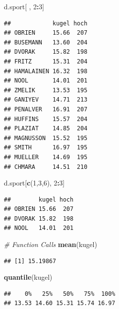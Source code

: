 \documentclass[
]{article}
\newenvironment{Shaded}{\begin{snugshade}}{\end{snugshade}}
\newcommand{\CommentTok}[1]{\textcolor[rgb]{0.56,0.35,0.01}{\textit{#1}}}
\newcommand{\DecValTok}[1]{\textcolor[rgb]{0.00,0.00,0.81}{#1}}
\newcommand{\FunctionTok}[1]{\textcolor[rgb]{0.13,0.29,0.53}{\textbf{#1}}}
\newcommand{\NormalTok}[1]{#1}
\newcommand{\SpecialCharTok}[1]{\textcolor[rgb]{0.81,0.36,0.00}{\textbf{#1}}}
\begin{document}
\begin{Shaded}
\begin{Highlighting}[]
\NormalTok{d.sport[ , }\DecValTok{2}\SpecialCharTok{:}\DecValTok{3}\NormalTok{]}
\end{Highlighting}
\end{Shaded}

\begin{verbatim}
##            kugel hoch
## OBRIEN     15.66  207
## BUSEMANN   13.60  204
## DVORAK     15.82  198
## FRITZ      15.31  204
## HAMALAINEN 16.32  198
## NOOL       14.01  201
## ZMELIK     13.53  195
## GANIYEV    14.71  213
## PENALVER   16.91  207
## HUFFINS    15.57  204
## PLAZIAT    14.85  204
## MAGNUSSON  15.52  195
## SMITH      16.97  195
## MUELLER    14.69  195
## CHMARA     14.51  210
\end{verbatim}

\begin{Shaded}
\begin{Highlighting}[]
\NormalTok{d.sport[}\FunctionTok{c}\NormalTok{(}\DecValTok{1}\NormalTok{,}\DecValTok{3}\NormalTok{,}\DecValTok{6}\NormalTok{), }\DecValTok{2}\SpecialCharTok{:}\DecValTok{3}\NormalTok{]}
\end{Highlighting}
\end{Shaded}

\begin{verbatim}
##        kugel hoch
## OBRIEN 15.66  207
## DVORAK 15.82  198
## NOOL   14.01  201
\end{verbatim}

\begin{Shaded}
\begin{Highlighting}[]
\CommentTok{\# Function Calls}
\FunctionTok{mean}\NormalTok{(kugel)}
\end{Highlighting}
\end{Shaded}

\begin{verbatim}
## [1] 15.19867
\end{verbatim}

\begin{Shaded}
\begin{Highlighting}[]
\FunctionTok{quantile}\NormalTok{(kugel)}
\end{Highlighting}
\end{Shaded}

\begin{verbatim}
##    0%   25%   50%   75%  100% 
## 13.53 14.60 15.31 15.74 16.97
\end{verbatim}
\end{document}
